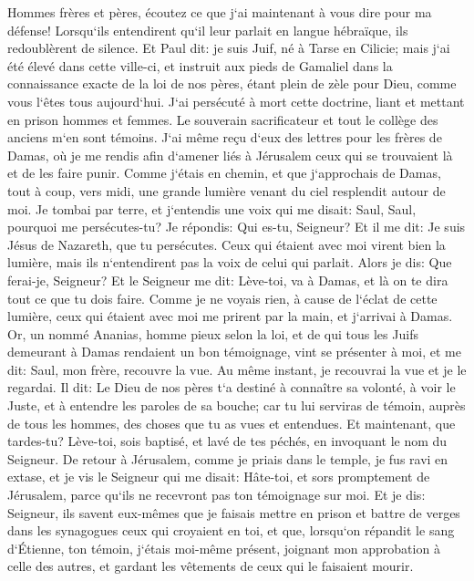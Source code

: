 \verse Hommes frères et pères, écoutez ce que j`ai maintenant à vous dire pour ma défense! 
\verse Lorsqu`ils entendirent qu`il leur parlait en langue hébraïque, ils redoublèrent de silence. Et Paul dit: 
\verse je suis Juif, né à Tarse en Cilicie; mais j`ai été élevé dans cette ville-ci, et instruit aux pieds de Gamaliel dans la connaissance exacte de la loi de nos pères, étant plein de zèle pour Dieu, comme vous l`êtes tous aujourd`hui. 
\verse J`ai persécuté à mort cette doctrine, liant et mettant en prison hommes et femmes. 
\verse Le souverain sacrificateur et tout le collège des anciens m`en sont témoins. J`ai même reçu d`eux des lettres pour les frères de Damas, où je me rendis afin d`amener liés à Jérusalem ceux qui se trouvaient là et de les faire punir. 
\verse Comme j`étais en chemin, et que j`approchais de Damas, tout à coup, vers midi, une grande lumière venant du ciel resplendit autour de moi. 
\verse Je tombai par terre, et j`entendis une voix qui me disait: Saul, Saul, pourquoi me persécutes-tu? 
\verse Je répondis: Qui es-tu, Seigneur? Et il me dit: Je suis Jésus de Nazareth, que tu persécutes. 
\verse Ceux qui étaient avec moi virent bien la lumière, mais ils n`entendirent pas la voix de celui qui parlait. Alors je dis: Que ferai-je, Seigneur? 
\verse Et le Seigneur me dit: Lève-toi, va à Damas, et là on te dira tout ce que tu dois faire. 
\verse Comme je ne voyais rien, à cause de l`éclat de cette lumière, ceux qui étaient avec moi me prirent par la main, et j`arrivai à Damas. 
\verse Or, un nommé Ananias, homme pieux selon la loi, et de qui tous les Juifs demeurant à Damas rendaient un bon témoignage, vint se présenter à moi, 
\verse et me dit: Saul, mon frère, recouvre la vue. Au même instant, je recouvrai la vue et je le regardai. 
\verse Il dit: Le Dieu de nos pères t`a destiné à connaître sa volonté, à voir le Juste, et à entendre les paroles de sa bouche; 
\verse car tu lui serviras de témoin, auprès de tous les hommes, des choses que tu as vues et entendues. 
\verse Et maintenant, que tardes-tu? Lève-toi, sois baptisé, et lavé de tes péchés, en invoquant le nom du Seigneur. 
\verse De retour à Jérusalem, comme je priais dans le temple, je fus ravi en extase, 
\verse et je vis le Seigneur qui me disait: Hâte-toi, et sors promptement de Jérusalem, parce qu`ils ne recevront pas ton témoignage sur moi. 
\verse Et je dis: Seigneur, ils savent eux-mêmes que je faisais mettre en prison et battre de verges dans les synagogues ceux qui croyaient en toi, et que, 
\verse lorsqu`on répandit le sang d`Étienne, ton témoin, j`étais moi-même présent, joignant mon approbation à celle des autres, et gardant les vêtements de ceux qui le faisaient mourir. 
